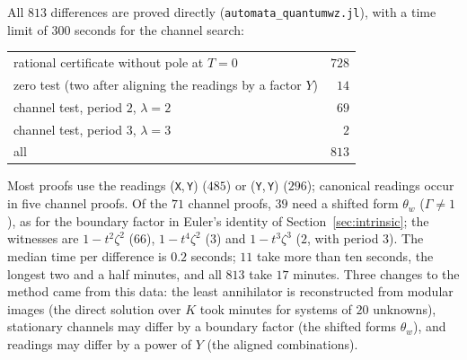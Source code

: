 \documentclass[11pt,a4paper]{article}
\theoremstyle{plain}
\theoremstyle{definition}
\theoremstyle{remark}
\begin{document}
All $813$ differences are proved directly (\texttt{automata\_quantumwz.jl}), with
a time limit of $300$ seconds for the channel search:
\begin{center}
\begin{tabular}{@{}lr@{}}
\toprule
rational certificate without pole at $T=0$ & $728$\\
zero test (two after aligning the readings by a factor $Y$) & $14$\\
channel test, period $2$, $\lambda=2$ & $69$\\
channel test, period $3$, $\lambda=3$ & $2$\\\midrule
all & $813$\\
\bottomrule
\end{tabular}
\end{center}
Most proofs use the readings (\texttt{X},\,\texttt{Y}) ($485$) or
(\texttt{Y},\,\texttt{Y}) ($296$); canonical readings occur in five channel
proofs. Of the $71$ channel proofs, $39$ need a shifted form $\theta_w$
($\Gamma\ne1$), as for the boundary factor in Euler's identity of
Section~\ref{sec:intrinsic}; the witnesses are $1-t^2\zeta^2$ ($66$),
$1-t^4\zeta^2$ ($3$) and $1-t^3\zeta^3$ ($2$, with period $3$). The median time per
difference is $0.2$ seconds; $11$ take more than ten seconds, the longest
two and a half minutes, and all $813$ take $17$ minutes. Three changes to the method
came from this data: the least annihilator is reconstructed from modular images
(the direct solution over $K$ took minutes for systems of $20$ unknowns),
stationary channels may differ by a boundary factor (the shifted forms
$\theta_w$), and readings may differ by a power of $Y$ (the aligned
combinations).
\end{document}
